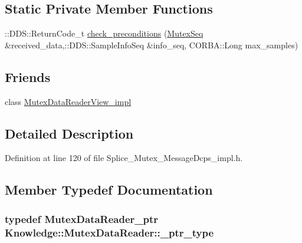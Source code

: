 \subsection*{Static Private Member Functions}
\begin{DoxyCompactItemize}
\item 
::DDS::ReturnCode\_\-t \hyperlink{classKnowledge_1_1MutexDataReader__impl_a67036761b2438b8d1f668d51dfef2431}{check\_\-preconditions} (\hyperlink{namespaceKnowledge_a3165529aa87299c6a92754fbd7eeeff4}{MutexSeq} \&received\_\-data,::DDS::SampleInfoSeq \&info\_\-seq, CORBA::Long max\_\-samples)
\end{DoxyCompactItemize}
\subsection*{Friends}
\begin{DoxyCompactItemize}
\item 
class \hyperlink{classKnowledge_1_1MutexDataReader__impl_aec93c4287b5ec4bc134f9df9c89ebcca}{MutexDataReaderView\_\-impl}
\end{DoxyCompactItemize}


\subsection{Detailed Description}


Definition at line 120 of file Splice\_\-Mutex\_\-MessageDcps\_\-impl.h.



\subsection{Member Typedef Documentation}
\hypertarget{classKnowledge_1_1MutexDataReader_a6ce4984d18dc73062308b9481f58d1d9}{
\subsubsection[{\_\-ptr\_\-type}]{\setlength{\rightskip}{0pt plus 5cm}typedef {\bf MutexDataReader\_\-ptr} {\bf Knowledge::MutexDataReader::\_\-ptr\_\-type}}}
\label{dc/d57/classKnowledge_1_1MutexDataReader_a6ce4984d18dc73062308b9481f58d1d9}


